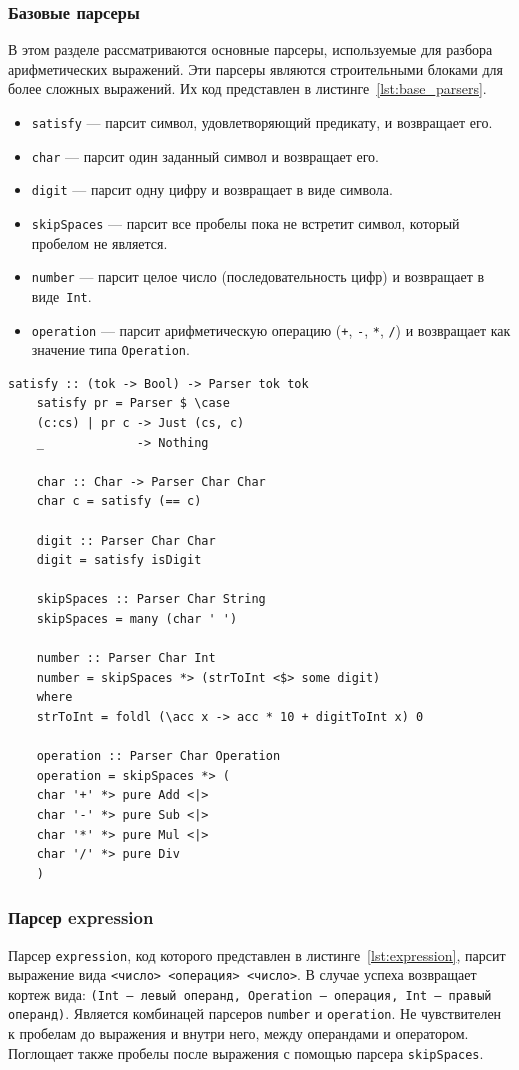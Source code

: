 \documentclass[a4paper, final]{article}
\begin{document}
\subsubsection{Базовые парсеры}

В этом разделе рассматриваются основные парсеры, используемые для разбора арифметических выражений. Эти парсеры являются строительными блоками для более сложных выражений. Их код представлен в листинге~\ref{lst:base_parsers}.

\begin{itemize}
	\item \texttt{satisfy} — парсит символ, удовлетворяющий предикату, и возвращает его.
	\item \texttt{char} — парсит один заданный символ и возвращает его.
	\item \texttt{digit} — парсит одну цифру и возвращает в виде символа.
	\item \texttt{skipSpaces} — парсит все пробелы пока не встретит символ, который пробелом не является.
	\item \texttt{number} — парсит целое число (последовательность цифр) и возвращает в виде~\texttt{Int}.
	\item \texttt{operation} — парсит арифметическую операцию (\texttt{+}, \texttt{-}, \texttt{*}, \texttt{/}) и возвращает как значение типа \texttt{Operation}.
\end{itemize}

\begin{lstlisting}[caption={Базовые парсеры}, label={lst:base_parsers}]
	satisfy :: (tok -> Bool) -> Parser tok tok
	satisfy pr = Parser $ \case
	(c:cs) | pr c -> Just (cs, c)
	_             -> Nothing
	
	char :: Char -> Parser Char Char
	char c = satisfy (== c)
	
	digit :: Parser Char Char
	digit = satisfy isDigit
	
	skipSpaces :: Parser Char String
	skipSpaces = many (char ' ')
	
	number :: Parser Char Int
	number = skipSpaces *> (strToInt <$> some digit)
	where 
	strToInt = foldl (\acc x -> acc * 10 + digitToInt x) 0
	
	operation :: Parser Char Operation
	operation = skipSpaces *> (
	char '+' *> pure Add <|>
	char '-' *> pure Sub <|>
	char '*' *> pure Mul <|>
	char '/' *> pure Div
	)
\end{lstlisting}    

\subsubsection{Парсер expression}
Парсер \texttt{expression}, код которого представлен в листинге~\ref{lst:expression}, парсит выражение вида \texttt{<число> <операция> <число>}. В случае успеха возвращает кортеж вида: \texttt{(Int -- левый операнд, Operation -- операция, Int -- правый операнд)}. Является комбинацей парсеров \texttt{number} и \texttt{operation}. Не чувствителен к пробелам до выражения и внутри него, между операндами и оператором. Поглощает также пробелы после выражения с помощью парсера \texttt{skipSpaces}.
\end{document}
